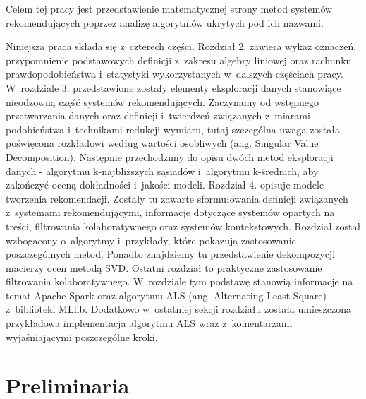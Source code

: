 \documentclass[12pt,a4paper]{report}
\begin{document}
Celem tej pracy jest przedstawienie matematycznej strony metod systemów rekomendujących poprzez analizę algorytmów ukrytych pod ich nazwami.

Niniejsza praca składa się z~czterech części. Rozdział 2. zawiera wykaz oznaczeń, przypomnienie podstawowych definicji z~zakresu algebry liniowej oraz rachunku prawdopodobieństwa i~statystyki wykorzystanych w~dalszych częściach pracy. W~rozdziale 3. przedstawione zostały elementy eksploracji danych stanowiące nieodzowną część systemów rekomendujących. Zaczynamy od wstępnego przetwarzania danych oraz definicji i~twierdzeń związanych z~miarami podobieństwa i~technikami redukcji wymiaru, tutaj szczególna uwaga została poświęcona rozkładowi według wartości osobliwych (ang. Singular Value Decomposition). Następnie przechodzimy do opisu dwóch metod eksploracji danych - algorytmu k-najbliższych sąsiadów i~algorytmu k-średnich, aby zakończyć oceną dokładności i~jakości modeli. Rozdział 4. opisuje modele tworzenia rekomendacji. Zostały tu zawarte sformułowania definicji związanych z~systemami rekomendującymi, informacje dotyczące systemów opartych na treści, filtrowania kolaboratywnego oraz systemów kontekstowych. Rozdział został wzbogacony o~algorytmy i~przykłady, które pokazują zastosowanie poszczególnych metod. Ponadto znajdziemy tu przedstawienie dekompozycji macierzy ocen metodą SVD. Ostatni rozdział to praktyczne zastosowanie filtrowania kolaboratywnego. W~rozdziale tym podstawę stanowią informacje na temat Apache Spark oraz algorytmu ALS (ang. Alternating Least Square) z~biblioteki MLlib. Dodatkowo w~ostatniej sekcji rozdziału została umieszczona przykładowa implementacja algorytmu ALS wraz z~komentarzami wyjaśniającymi poszczególne kroki. 



\chapter{Preliminaria} %
\end{document}
